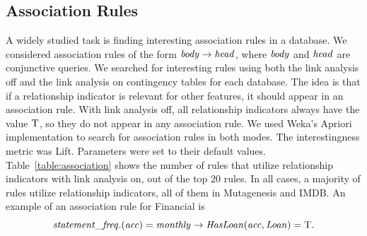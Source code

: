 \documentclass{acm_proc_article-sp}
\begin{document}


\subsection{Association Rules} A widely studied task is finding interesting association rules in a database. We considered association rules of the form $\it{body} \rightarrow \it{head}$, where $\it{body}$ and $\it{head}$ are conjunctive queries. 
%
We searched for interesting rules using both the link analysis off and the link analysis on contingency tables for each database. The idea is that if a relationship indicator is relevant for other features, it should appear in an association rule. With link analysis off, all relationship indicators always have the value $\mathrm{T}$, so they do not appear in any association rule. We used Weka's Apriori implementation to search for association rules in both modes. The interestingness metric was Lift. Parameters were set to their default values. Table~\ref{table:association} shows the number of rules that utilize relationship indicators with link analysis on, out of the top 20 rules. In all cases, a majority of rules utilize relationship indicators, all of them in Mutagenesis and IMDB. An example of an association rule for Financial is 
%
$$\it{statement\_freq.(acc)} = \it{monthly} \rightarrow \it{HasLoan}(\it{acc},\it{Loan}) = \mathrm{T}.$$
%
\begin{table}[htbp] \centering
{}
\caption{Number of top 20 Association Rules that use relationship indicator features.}
  \label{table:association}%
\end{table}%
\end{document}

